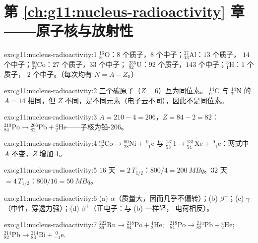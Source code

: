  \section*{第 \ref{ch:g11:nucleus-radioactivity} 章——原子核与放射性}

\begin{solution}{exo:g11:nucleus-radioactivity:1}
${}^{16}_{8}\mathrm{O}$：$8$ 个质子，$8$ 个中子；${}^{27}_{13}\mathrm{Al}$：$13$ 个质子，
$14$ 个中子；${}^{60}_{27}\mathrm{Co}$：$27$ 个质子，$33$ 个中子；
${}^{235}_{92}\mathrm{U}$：$92$ 个质子，$143$ 个中子；${}^{3}_{1}\mathrm{H}$：$1$ 个质子，
$2$ 个中子。（每次均有 $N = A - Z$。）
\end{solution}

\begin{solution}{exo:g11:nucleus-radioactivity:2}
三个碳原子（$Z = 6$）互为同位素。
${}^{14}_{6}\mathrm{C}$ 与 ${}^{14}_{7}\mathrm{N}$ 的 $A = 14$ 相同，但
$Z$ 不同，是不同元素（电子云不同），因此不是同位素。
\end{solution}

\begin{solution}{exo:g11:nucleus-radioactivity:3}
$A = 210 - 4 = 206$，$Z = 84 - 2 = 82$：
${}^{210}_{84}\mathrm{Po} \to {}^{206}_{82}\mathrm{Pb} +
{}^{4}_{2}\mathrm{He}$——子核为铅-206。
\end{solution}

\begin{solution}{exo:g11:nucleus-radioactivity:4}
${}^{60}_{27}\mathrm{Co} \to {}^{60}_{28}\mathrm{Ni} +
{}^{\;0}_{-1}\mathrm{e}$ 与
${}^{131}_{53}\mathrm{I} \to {}^{131}_{54}\mathrm{Xe} +
{}^{\;0}_{-1}\mathrm{e}$：两式中 $A$ 不变，$Z$ 增加 1。
\end{solution}

\begin{solution}{exo:g11:nucleus-radioactivity:5}
$16$ 天 $= 2\,T_{1/2}$：$800/4 = \qty{200}{MBq}$。$32$ 天
$= 4\,T_{1/2}$：$800/16 = \qty{50}{MBq}$。
\end{solution}

\begin{solution}{exo:g11:nucleus-radioactivity:6}
(a) $\alpha$（质量大，因而几乎不偏转）；(b) $\beta^-$；(c) $\gamma$
（中性，穿透力强）；(d) $\beta^+$（正电子：与 (b) 一样轻，
电荷相反）。
\end{solution}

\begin{solution}{exo:g11:nucleus-radioactivity:7}
${}^{222}_{86}\mathrm{Rn} \to {}^{218}_{84}\mathrm{Po} +
{}^{4}_{2}\mathrm{He}$; \
${}^{218}_{84}\mathrm{Po} \to {}^{214}_{82}\mathrm{Pb} +
{}^{4}_{2}\mathrm{He}$; \
${}^{214}_{82}\mathrm{Pb} \to {}^{214}_{83}\mathrm{Bi} +
{}^{\;0}_{-1}\mathrm{e}$.
\end{solution}


